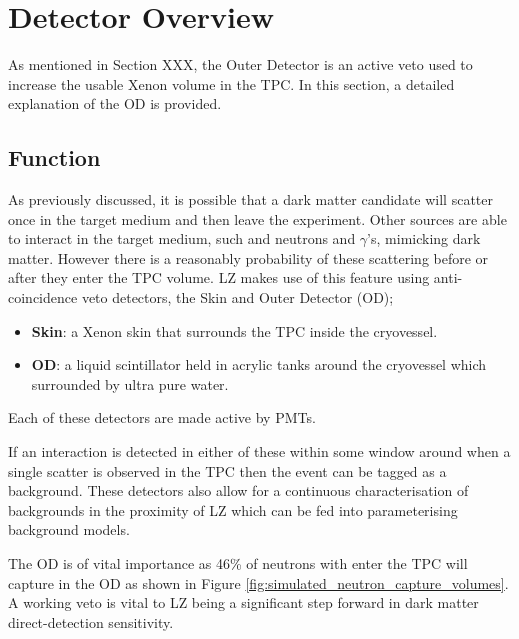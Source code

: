 \section{Detector Overview} \label{OD_detector_overview}
\par
As mentioned in Section XXX, the Outer Detector is an active veto used to increase the usable Xenon volume in the TPC.
In this section, a detailed explanation of the OD is provided.

\subsection{Function}
\par
As previously discussed, it is possible that a dark matter candidate will scatter once in the target medium and then leave the experiment.
Other sources are able to interact in the target medium, such and neutrons and $\gamma$'s, mimicking dark matter.
However there is a reasonably probability of these scattering before or after they enter the TPC volume.
LZ makes use of this feature using anti-coincidence veto detectors, the Skin and Outer Detector (OD);
\begin{itemize}
    \item \textbf{Skin}: a Xenon skin that surrounds the TPC inside the cryovessel.
    \item \textbf{OD}: a liquid scintillator held in acrylic tanks around the cryovessel which surrounded by ultra pure water.
\end{itemize}
Each of these detectors are made active by PMTs.
\par
If an interaction is detected in either of these within some window around when a single scatter is observed in the TPC then the event can be tagged as a background.
These detectors also allow for a continuous characterisation of backgrounds in the proximity of LZ which can be fed into parameterising background models.


\par
The OD is of vital importance as 46\% of neutrons with enter the TPC will capture in the OD as shown in Figure \ref{fig:simulated_neutron_capture_volumes}.
A working veto is vital to LZ being a significant step forward in dark matter direct-detection sensitivity.



